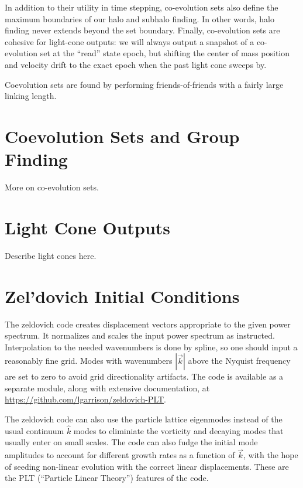 \documentclass[11pt,preprint]{aastex}
\newenvironment{private}{\comment}{\endcomment}
\newenvironment{private}
    {\textbf{Not public:}\\
    \begin{tabular}{|p{0.9\textwidth}|}
    \hline\\
    }
    {
    \\\\\hline
    \end{tabular}
    }
\begin{document}
In addition to their utility in time stepping, co-evolution sets
also define the maximum boundaries of our halo and subhalo finding.
In other words, halo finding never extends beyond the set boundary.
Finally, co-evolution sets are cohesive for light-cone outputs: we
will always output a snapshot of a co-evolution set at the ``read''
state epoch, but shifting the center of mass position and velocity
drift to the exact epoch when the past light cone sweeps by.

Coevolution sets are found by performing friends-of-friends with a
fairly large linking length.

\begin{private}
\section{Coevolution Sets and Group Finding}

More on co-evolution sets.
\end{private}

\begin{private}
\section{Light Cone Outputs}

Describe light cones here.
\end{private}

\section{Zel'dovich Initial Conditions}

The zeldovich code creates displacement vectors appropriate to 
the given power spectrum.  It normalizes and scales the input
power spectrum as instructed.  Interpolation to the needed wavenumbers
is done by spline, so one should input a reasonably fine grid.
Modes with wavenumbers $|\vec{k}|$ above the Nyquist frequency are
set to zero to avoid grid directionality artifacts.
The code is available as a separate module, along with extensive documentation,
at \url{https://github.com/lgarrison/zeldovich-PLT}.

The zeldovich code can also use the particle lattice eigenmodes
instead of the usual continuum $\hat{k}$ modes to eliminiate
the vorticity and decaying modes that usually enter on small scales.
The code can also fudge the initial mode amplitudes to account for
different growth rates as a function of $\vec{k}$, with the hope of
seeding non-linear evolution with the correct linear displacements.
These are the PLT (``Particle Linear Theory'') features of the code.
\end{document}
